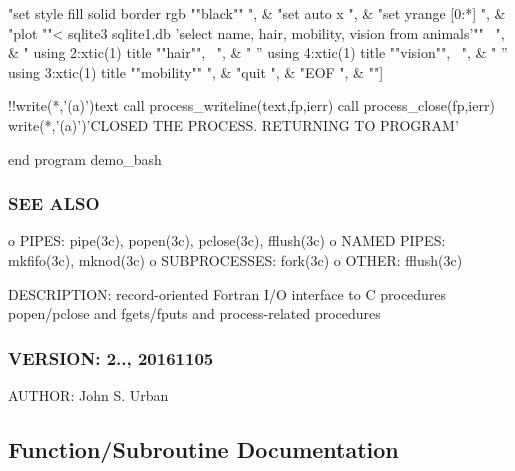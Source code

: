 \begin{DoxyVerb}
"set style fill solid border rgb ""black""                                             ", &
"set auto x                                                                            ", &
"set yrange [0:*]                                                                      ", &
"plot ""< sqlite3 sqlite1.db  'select name, hair, mobility, vision  from animals'"" \  ", &
"      using 2:xtic(1) title ""hair"",  \                                              ", &
"   '' using 4:xtic(1) title ""vision"", \                                             ", &
"   '' using 3:xtic(1) title ""mobility""                                              ", &
"quit                                                                                  ", &
"EOF                                                                                   ", &
""]

   !!write(*,'(a)')text
   call process_writeline(text,fp,ierr)
   call process_close(fp,ierr)
   write(*,'(a)')'CLOSED THE PROCESS. RETURNING TO PROGRAM'

end program demo_bash
\end{DoxyVerb}


\subsubsection*{S\+EE A\+L\+SO}

\begin{DoxyVerb}   o PIPES: pipe(3c), popen(3c), pclose(3c), fflush(3c)
   o NAMED PIPES: mkfifo(3c), mknod(3c)
   o SUBPROCESSES: fork(3c)
   o OTHER: fflush(3c) \end{DoxyVerb}


D\+E\+S\+C\+R\+I\+P\+T\+I\+ON\+: record-\/oriented Fortran I/O interface to C procedures popen/pclose and fgets/fputs and process-\/related procedures \subsubsection*{V\+E\+R\+S\+I\+ON\+: 2.., 20161105}

A\+U\+T\+H\+OR\+: John S. Urban 

\subsection{Function/\+Subroutine Documentation}
\mbox{\label{namespacem__process_ab4c5cad3fb46686f0c9b71c3a634f6ae}} 
